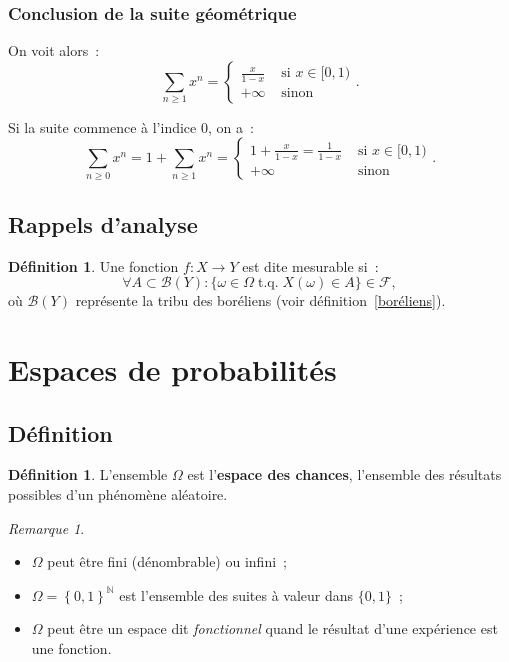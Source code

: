 \documentclass{article}
\newcommand{\N}{\mathbb N}
\DeclareMathOperator{\tq}{t.q.}
\theoremstyle{definition}
\newtheorem{déf}[thm]{Définition}
\theoremstyle{remark}
\newtheorem*{rmq}{Remarque}
\begin{document}
		\subsubsection{Conclusion de la suite géométrique}
		On voit alors~:
		\[\sum_{n \geq 1}x^n = \begin{cases}\frac x{1-x} &\text{ si } x \in [0, 1) \\ +\infty & \text{ sinon }\end{cases}.\]

		Si la suite commence à l'indice 0, on a~:
		\[\sum_{n \geq 0}x^n = 1 + \sum_{n \geq 1}x^n = \begin{cases}1 + \frac x{1-x} = \frac 1{1-x} &\text { si } x \in [0, 1) \\ +\infty &\text{ sinon}\end{cases}.\]
	
	\subsection{Rappels d'analyse}
		\begin{déf} Une fonction $f : X \to Y$ est dite mesurable si~:
		\[\forall A \subset \mathcal B(Y) : \{\omega \in \Omega \tq X(\omega) \in A\} \in \mathcal F,\]
		où $\mathcal B(Y)$ représente la tribu des boréliens (voir définition~\ref{boréliens}). \end{déf}

\section{Espaces de probabilités}
	\subsection{Définition}
		\begin{déf} L'ensemble $\Omega$ est l'\textbf{espace des chances}, l'ensemble des résultats possibles d'un phénomène aléatoire. \end{déf}

		\begin{rmq}~
		\begin{itemize}
			\item $\Omega$ peut être fini (dénombrable) ou infini~;
			\item $\Omega = \left\{0, 1\right\}^\N$ est l'ensemble des suites à valeur dans $\{0, 1\}$~;
			\item $\Omega$ peut être un espace dit \textit{fonctionnel} quand le résultat d'une expérience est une fonction.
		\end{itemize}
		\end{rmq}
\end{document}
